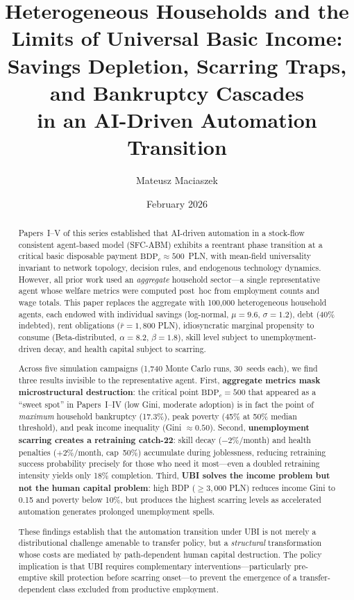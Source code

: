 \documentclass[12pt,a4paper]{article}
\title{\textbf{Heterogeneous Households and the Limits of Universal Basic Income:\\
Savings Depletion, Scarring Traps, and Bankruptcy Cascades\\
in an AI-Driven Automation Transition}}
\author{Mateusz Maciaszek}
\date{{\small February 2026}}
\begin{document}
\maketitle

\begin{abstract}

Papers~I--V of this series established that AI-driven automation in a
stock-flow consistent agent-based model (SFC-ABM) exhibits a reentrant
phase transition at a critical basic disposable payment
$\mathrm{BDP}_c \approx 500$~PLN, with mean-field universality invariant to
network topology, decision rules, and endogenous technology dynamics.
However, all prior work used an \emph{aggregate} household sector---a
single representative agent whose welfare metrics were computed post~hoc
from employment counts and wage totals. This paper replaces the aggregate
with 100,000 heterogeneous household agents, each endowed with individual
savings (log-normal, $\mu = 9.6$, $\sigma = 1.2$), debt (40\% indebted),
rent obligations ($\bar{r} = 1{,}800$ PLN), idiosyncratic marginal
propensity to consume (Beta-distributed, $\alpha = 8.2$, $\beta = 1.8$),
skill level subject to unemployment-driven decay, and health capital
subject to scarring.

Across five simulation campaigns (1,740 Monte Carlo runs, 30~seeds each),
we find three results invisible to the representative agent. First,
\textbf{aggregate metrics mask microstructural destruction}: the critical
point $\mathrm{BDP}_c = 500$ that appeared as a ``sweet spot'' in
Papers~I--IV (low Gini, moderate adoption) is in fact the point of
\emph{maximum} household bankruptcy (17.3\%), peak poverty (45\% at 50\%
median threshold), and peak income inequality (Gini $\approx 0.50$).
Second, \textbf{unemployment scarring creates a retraining catch-22}:
skill decay ($-2\%$/month) and health penalties ($+2\%$/month, cap~50\%)
accumulate during joblessness, reducing retraining success probability
precisely for those who need it most---even a doubled retraining
intensity yields only 18\% completion. Third, \textbf{UBI solves the
income problem but not the human capital problem}: high BDP ($\geq 3{,}000$
PLN) reduces income Gini to 0.15 and poverty below 10\%, but produces the
highest scarring levels as accelerated automation generates prolonged
unemployment spells.

These findings establish that the automation transition under UBI is not
merely a distributional challenge amenable to transfer policy, but a
\emph{structural} transformation whose costs are mediated by path-dependent
human capital destruction. The policy implication is that UBI requires
complementary interventions---particularly pre-emptive skill protection
before scarring onset---to prevent the emergence of a transfer-dependent
class excluded from productive employment.


\end{abstract}
\end{document}
